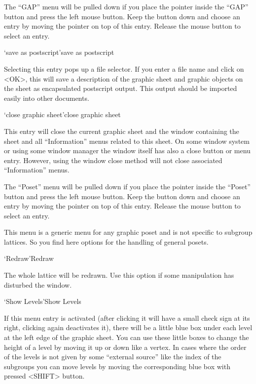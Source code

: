 
The ``GAP'' menu will  be pulled down if  you place the pointer inside  the
``GAP'' button  and press the left mouse  button.  Keep the button down and
choose an entry by moving the pointer on  top of this entry.  Release the
mouse button to select an entry.

\>`save as postscript'{save as postscript}

Selecting this entry pops up a file  selector.  If you  enter a file name
and click on <OK>, this will save a  description of the graphic sheet and
graphic objects on  the sheet as encapsulated postscript  output. This
output should be imported easily into other documents.

\>`close graphic sheet'{close graphic sheet}

This entry will close the current graphic sheet and the window containing
the sheet  and all  ``Information'' menus related  to  this sheet.  On some
window system or using  some window manager the window  itself has also a
close button or menu entry.  However,  using the window close method will
not close associated ``Information'' menus.



The ``Poset'' menu will be pulled down if you place the pointer inside the
``Poset'' button and  press the left mouse  button.  Keep  the button down
and choose an entry by moving the pointer on top of  this entry.  Release
the mouse button to select an entry.

This menu is a generic menu for any graphic poset and is not specific to
subgroup lattices. So you find here options for the handling of general
posets. 

\>`Redraw'{Redraw}

  The whole lattice will be redrawn. Use this option if some manipulation
  has disturbed the window.
  
\>`Show Levels'{Show Levels}

  If this menu entry is activated (after clicking it will have a small
  check sign at its right, clicking again deactivates it), there will be a
  little blue box under each level at the left edge of the graphic
  sheet. You can use these little boxes to change the height of a level by
  moving it up or down like a vertex. In cases where the order of the
  levels is not given by some ``external source'' like the index of the
  subgroups you can move levels by moving the corresponding blue box with
  pressed <SHIFT> button.
  
